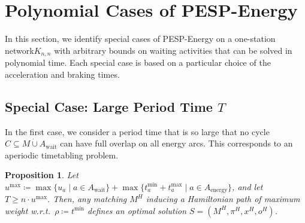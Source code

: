\documentclass[11pt,a4paper]{article}
\newcommand{\dotcup}{\mathbin{\dot\cup}}
\newcommand{\wait}{\mathrm{wait}}
\newcommand{\energy}{\mathrm{energy}}
\newcommand{\energyact}{M}               %
\newcommand{\pespenergy}{PESP-Energy\xspace}
\newcommand{\osn}{one-station network\xspace}
\newcommand{\w}{\rho} %
\newtheorem{proposition}[theorem]{Proposition}
\theoremstyle{definition}
\theoremstyle{remark}
\begin{document}
\section{Polynomial Cases of \pespenergy}
\label{sec-Special-Cases}
In this section, we identify special cases of \pespenergy on a \osn $K_{n,n}$ with arbitrary bounds on waiting activities that can be solved in polynomial time.
Each special case is based on a particular choice of the acceleration and braking times.

\subsection{Special Case: Large Period Time $T$}
\label{sec-SC-T-big}
In the first case, we consider a period time that is so large that no cycle $C \subseteq \energyact\dotcup A_{\wait}$ can have full overlap on all energy arcs. This corresponds to an aperiodic timetabling problem.

\begin{proposition}\label{prop:specialcase2}
    Let $u^{\max} \coloneqq \max\{u_a \mid a \in A_\wait\}+ \max\{t^{\min}_{a}+
    t^{\max}_{a} \mid  a \in A_\energy\}$, and let 
    $T \geq n \cdot u^{\max}$. Then, any matching $\energyact^{H}$ inducing a Hamiltonian path of maximum weight w.r.t.\ $\w \coloneqq t^{\min}$ defines an optimal solution $S=(\energyact^{H}, \pi^H, x^H, o^H)$. 
\end{proposition}
\end{document}
